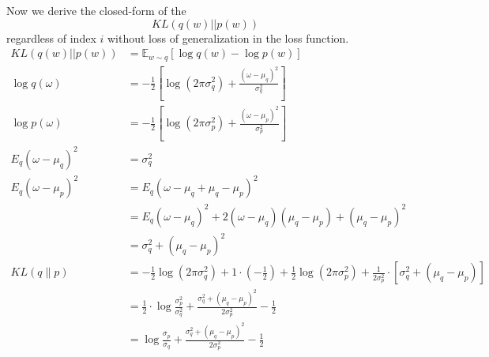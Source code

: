 \documentclass{article}
\begin{document}
Now we derive the closed-form of the $$KL(q(w)||p(w))$$ regardless of index $i$ without loss of generalization in the loss function.
$$
\begin{aligned}
KL(q(w)||p(w)) &= \mathbb{E}_{w \sim q}[\log q(w)-\log p(w)]\\
\log q(\omega) & =-\frac{1}{2}\left[\log \left(2 \pi \sigma_q^2\right)+\frac{\left(\omega-\mu_q\right)^2}{\sigma_q^2}\right] \\
\log p(\omega) & =-\frac{1}{2}\left[\log \left(2 \pi \sigma_p^2\right)+\frac{\left(\omega-\mu_p\right)^2}{\sigma_p^2}\right] \\
E_q\left(\omega-\mu_q\right)^2 & =\sigma_q^2 \\
E_q\left(\omega-\mu_p\right)^2 & =E_q\left(\omega-\mu_q+\mu_q-\mu_p\right)^2 \\
& =E_q\left(\omega-\mu_q\right)^2+2\left(\omega-\mu_q\right)\left(\mu_q-\mu_p\right)+\left(\mu_q-\mu_p\right)^2 \\
& =\sigma_q^2+\left(\mu_q-\mu_p\right)^2 \\
K L(q \| p) & =-\frac{1}{2} \log \left(2 \pi \sigma_q^2\right)+1 \cdot\left(-\frac{1}{2}\right)+\frac{1}{2} \log \left(2 \pi \sigma_p^2\right)+\frac{1}{2 \sigma_p^2} \cdot\left[\sigma_q^2+\left(\mu_q-\mu_p\right)\right] \\
& =\frac{1}{2} \cdot \log \frac{\sigma_p^2}{\sigma_q^2}+\frac{\sigma_q^2+\left(\mu_q-\mu_p\right)^2}{2 \sigma_p^2}-\frac{1}{2} \\
& =\log \frac{\sigma_p}{\sigma_q}+\frac{\sigma_q^2+\left(\mu_q-\mu_p\right)^2}{2 \sigma_p^2}-\frac{1}{2}
\end{aligned}
$$
\end{document}
